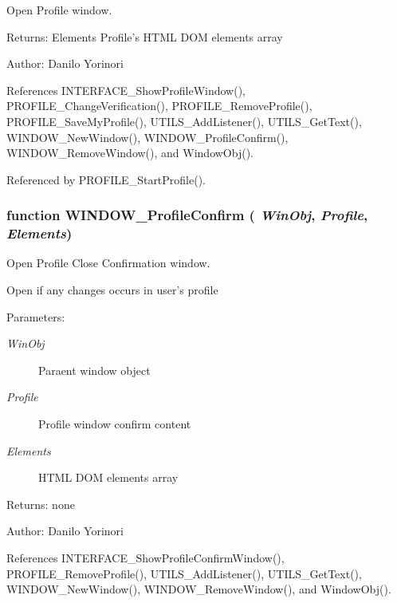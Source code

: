 Open Profile window. 

\begin{Desc}
\item[Returns:]Elements Profile's HTML DOM elements array \end{Desc}
\begin{Desc}
\item[Author:]Danilo Yorinori \end{Desc}


References INTERFACE\_\-ShowProfileWindow(), PROFILE\_\-ChangeVerification(), PROFILE\_\-RemoveProfile(), PROFILE\_\-SaveMyProfile(), UTILS\_\-AddListener(), UTILS\_\-GetText(), WINDOW\_\-NewWindow(), WINDOW\_\-ProfileConfirm(), WINDOW\_\-RemoveWindow(), and WindowObj().

Referenced by PROFILE\_\-StartProfile().
\subsubsection[WINDOW\_\-ProfileConfirm]{\setlength{\rightskip}{0pt plus 5cm}function WINDOW\_\-ProfileConfirm ( {\em WinObj}, \/   {\em Profile}, \/   {\em Elements})}\label{window_2window_8js_5d1838bded74af41a5729c3971adf888}


Open Profile Close Confirmation window. 

Open if any changes occurs in user's profile

\begin{Desc}
\item[Parameters:]
\begin{description}
\item[{\em WinObj}]Paraent window object \item[{\em Profile}]Profile window confirm content \item[{\em Elements}]HTML DOM elements array \end{description}
\end{Desc}
\begin{Desc}
\item[Returns:]none \end{Desc}
\begin{Desc}
\item[Author:]Danilo Yorinori \end{Desc}


References INTERFACE\_\-ShowProfileConfirmWindow(), PROFILE\_\-RemoveProfile(), UTILS\_\-AddListener(), UTILS\_\-GetText(), WINDOW\_\-NewWindow(), WINDOW\_\-RemoveWindow(), and WindowObj().

